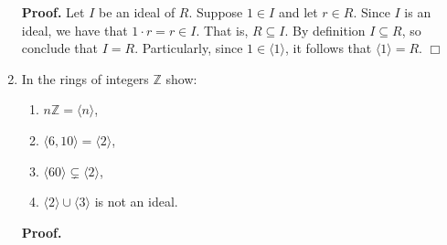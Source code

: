 \documentclass[9pt]{article}
\newcommand{\qed}{\hfill \ensuremath{\Box}}
\newcommand{\cyc}[1]{\langle #1 \rangle}
\newcommand{\Z}{\mathbb{Z}}
\begin{document}
\begin{enumerate}
      \textbf{Proof.}  Let $I$ be an ideal of $R$. Suppose $1 \in I$ and let
      $r \in R$. Since $I$ is an ideal, we have that $1 \cdot r = r \in I$. That
      is, $R \subseteq I$. By definition $I \subseteq R$, so conclude that
      $I = R$. Particularly, since $1 \in \cyc{1}$, it follows that
      $\cyc{1} = R$. \qed
   \item In the rings of integers $\Z$ show:
         \begin{enumerate}
            \item $n\Z = \cyc{n}$,
            \item $\cyc{6, 10} = \cyc{2}$,
            \item $\cyc{60} \subsetneq \cyc{2}$,
            \item $\cyc{2} \cup \cyc{3}$ is not an ideal.
         \end{enumerate}
         
      \textbf{Proof.}
      

\end{enumerate}
\end{document}
